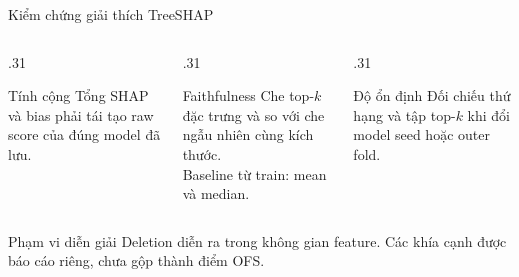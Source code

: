 \documentclass[aspectratio=169,10pt]{beamer}
\begin{document}
\begin{frame}{Kiểm chứng giải thích TreeSHAP}
\begin{columns}[T,onlytextwidth]
  \begin{column}{.31\textwidth}
    \begin{block}{Tính cộng}
      Tổng SHAP và bias phải tái tạo raw score của đúng model đã lưu.
    \end{block}
  \end{column}
  \begin{column}{.31\textwidth}
    \begin{block}{Faithfulness}
      Che top-$k$ đặc trưng và so với che ngẫu nhiên cùng kích thước.\\[.12cm]
      Baseline từ train: mean và median.
    \end{block}
  \end{column}
  \begin{column}{.31\textwidth}
    \begin{block}{Độ ổn định}
      Đối chiếu thứ hạng và tập top-$k$ khi đổi model seed hoặc outer fold.
    \end{block}
  \end{column}
\end{columns}
\vspace{.28cm}
\begin{block}{Phạm vi diễn giải}
Deletion diễn ra trong không gian feature. Các khía cạnh được báo cáo riêng, chưa gộp thành điểm OFS.
\end{block}
\end{frame}
\end{document}

